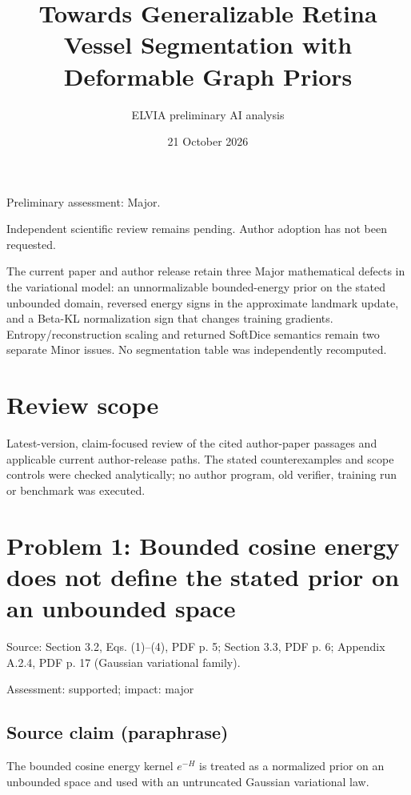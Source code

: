 \documentclass[11pt]{article}
\begin{document}
\title{Towards Generalizable Retina Vessel Segmentation with Deformable Graph Priors}

\author{ELVIA preliminary AI analysis}\date{21 October 2026}\maketitle

Preliminary assessment: Major.\par

Independent scientific review remains pending. Author adoption has not been requested.

The current paper and author release retain three Major mathematical defects in the variational model: an unnormalizable bounded-energy prior on the stated unbounded domain, reversed energy signs in the approximate landmark update, and a Beta-KL normalization sign that changes training gradients. Entropy/reconstruction scaling and returned SoftDice semantics remain two separate Minor issues. No segmentation table was independently recomputed.

\section*{Review scope}

Latest-version, claim-focused review of the cited author-paper passages and applicable current author-release paths. The stated counterexamples and scope controls were checked analytically; no author program, old verifier, training run or benchmark was executed.

\section*{Problem 1: Bounded cosine energy does not define the stated prior on an unbounded space}

Source: Section 3.2, Eqs. (1)–(4), PDF p. 5; Section 3.3, PDF p. 6; Appendix A.2.4, PDF p. 17 (Gaussian variational family).

Assessment: supported; impact: major

\subsection*{Source claim (paraphrase)}

The bounded cosine energy kernel \(e^{-H}\) is treated as a normalized prior on an unbounded space and used with an untruncated Gaussian variational law.
\end{document}
